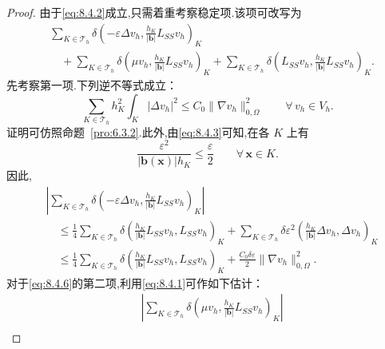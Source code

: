 \begin{proof}
由于\eqref{eq:8.4.2}成立,只需着重考察稳定项.该项可改写为
\begin{equation}\label{eq:8.4.6}
  \begin{aligned}
    &\sum_{K\in\mathcal T_h}\delta
      \left(-\varepsilon\Delta v_h,\frac{h_K}{|\boldsymbol{b}|}L_{SS}v_h\right)_K\\
    &\quad+\sum_{K\in\mathcal T_h}\delta
      \left(\mu v_h,\frac{h_K}{|\boldsymbol{b}|}L_{SS}v_h\right)_K
      +\sum_{K\in\mathcal T_h}\delta
      \left(L_{SS}v_h,\frac{h_K}{|\boldsymbol{b}|}L_{SS}v_h\right)_K .
  \end{aligned}
\end{equation}
先考察第一项.下列逆不等式成立：
\begin{equation}\label{eq:8.4.7}
  \sum_{K\in\mathcal T_h}h_K^2\int_K|\Delta v_h|^2
       \le C_0\|\nabla v_h\|_{0,\Omega}^2\qquad\forall\,v_h\in V_h.
\end{equation}
证明可仿照命题~\ref{pro:6.3.2}.此外,由\eqref{eq:8.4.3}可知,在各 \(K\) 上有
\begin{equation}\label{eq:8.4.8}
  \frac{\varepsilon^2}{|\boldsymbol{b}(\boldsymbol{x})|h_K}
      \le\frac{\varepsilon}2\qquad\forall\,\boldsymbol{x}\in K.
\end{equation}
因此,
\begin{equation}\label{eq:8.4.9}
  \begin{aligned}
    &\left|\sum_{K\in\mathcal T_h}\delta
         \left(-\varepsilon\Delta v_h,\frac{h_K}{|\boldsymbol{b}|}L_{SS}v_h\right)_K\right|\\
    &\quad\le\frac14\sum_{K\in\mathcal T_h}\delta
         \left(\frac{h_K}{|\boldsymbol{b}|}L_{SS}v_h,L_{SS}v_h\right)_K
       +\sum_{K\in\mathcal T_h}\delta\varepsilon^2
         \left(\frac{h_K}{|\boldsymbol{b}|}\Delta v_h,\Delta v_h\right)_K\\
    &\quad\le\frac14\sum_{K\in\mathcal T_h}\delta
         \left(\frac{h_K}{|\boldsymbol{b}|}L_{SS}v_h,L_{SS}v_h\right)_K
       +\frac{C_0\delta\varepsilon}{2}\|\nabla v_h\|_{0,\Omega}^2.
  \end{aligned}
\end{equation}
对于\eqref{eq:8.4.6}的第二项,利用\eqref{eq:8.4.1}可作如下估计：
\begin{equation}\label{eq:8.4.10}
  \begin{aligned}
    &\left|\sum_{K\in\mathcal T_h}\delta
       \left(\mu v_h,\frac{h_K}{|\boldsymbol{b}|}L_{SS}v_h\right)_K\right|\\

\end{aligned}
\end{equation}
\end{proof}
